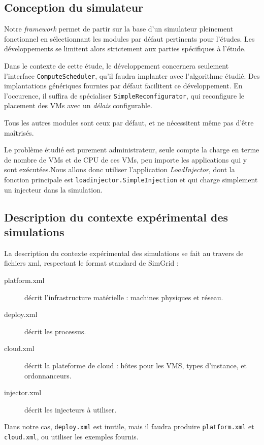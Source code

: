 \documentclass[parallelisme]{compas2017}
\begin{document}
\subsection{Conception du simulateur}

Notre \textit{framework} permet de partir sur la base d'un simulateur pleinement 
fonctionnel en sélectionnant les modules par défaut pertinents pour l'études. 
Les développements se limitent alors strictement aux parties spécifiques à 
l'étude.

Dans le contexte de cette étude, le développement concernera seulement 
l'interface \texttt{ComputeScheduler}, qu'il faudra implanter avec l'algorithme 
étudié. Des implantations génériques fournies par défaut facilitent ce 
développement. En l'occurence, il suffira de spécialiser 
\texttt{SimpleReconfigurator}, qui reconfigure le placement des VMs avec un 
\emph{délais} configurable.

Tous les autres modules sont ceux par défaut, et ne nécessitent même pas d'être 
maîtrisés.

Le problème étudié est purement administrateur, seule compte la charge en terme 
de nombre de VMs et de CPU de ces VMs, peu importe les applications qui y sont 
exécutées.Nous allons donc utiliser l'application \emph{LoadInjector}, dont la 
fonction principale est \texttt{loadinjector.SimpleInjection} et qui charge 
simplement un injecteur dans la simulation.

\subsection{Description du contexte expérimental des simulations}

La description du contexte expérimental des simulations se fait au travers de 
fichiers xml, respectant le format standard de SimGrid :

\begin{description}
	\item[platform.xml] décrit l'infrastructure matérielle : machines 
physiques et réseau.
	\item[deploy.xml] décrit les processus.
	\item[cloud.xml] décrit la plateforme de cloud : hôtes pour les VMS,
types d'instance, et ordonnanceurs.
	\item[injector.xml] décrit les injecteurs à utiliser.
\end{description}

Dans notre cas, \texttt{deploy.xml} est inutile, mais il faudra produire 
\texttt{platform.xml} et \texttt{cloud.xml}, ou utiliser les exemples fournis.
\end{document}

